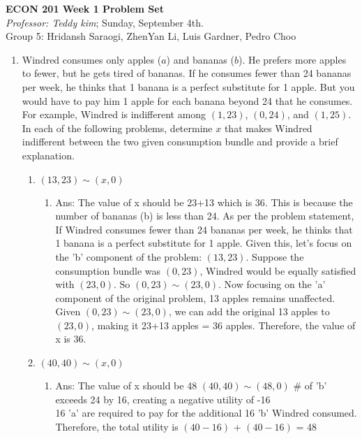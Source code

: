 \documentclass[11pt]{article}
\begin{document}
\begin{center}
\textbf{ECON 201 Week 1 Problem Set}\\
\textit {Professor: Teddy kim};  
Sunday, September 4th.
\\Group 5: Hridansh Saraogi, ZhenYan Li, Luis Gardner, Pedro Choo

\end{center}

\begin{enumerate}
\item Windred consumes only apples ($a$) and bananas ($b$). He prefers more apples to fewer, but he gets tired of bananas. If he consumes fewer than 24 bananas per week, he thinks that 1 banana is a perfect substitute for 1 apple. But you would have to pay him 1 apple for each banana beyond 24 that he consumes. For example, Windred is indifferent among $(1,23)$, $(0,24)$, and $(1,25)$. In each of the following problems, determine $x$ that makes Windred indifferent between the two given consumption bundle and provide a brief explanation.
    \begin{enumerate}
        \item $(13,23)\sim (x,0)$
        \begin{enumerate}
            \item Ans: The value of x should be 23+13 which is 36. This is because the number of bananas (b) is less than 24. As per the problem statement, If Windred consumes fewer than 24 bananas per week, he thinks that 1 banana is a perfect substitute for 1 apple. Given this, let's focus on the 'b' component of the problem: $(13,23)$. Suppose the consumption bundle was $(0,23)$, Windred would be equally satisfied with $(23,0)$. So $(0,23)\sim (23,0)$.
            Now focusing on the 'a' component of the original problem, 13 apples remains unaffected. Given $(0,23)\sim (23,0)$, we can add the original 13 apples to $(23,0)$, making it 23+13 apples = 36 apples. Therefore, the value of x is 36. 
        \end{enumerate}
        \item $(40,40)\sim (x,0)$
        \begin{enumerate}
            \item Ans: The value of x should be 48
            $(40,40)\sim (48,0)$
            # of 'b' exceeds 24 by 16, creating a negative utility of -16
            \\16 'a' are required to pay for the additional 16 'b' Windred consumed. Therefore, the total utility is $(40-16)$ + $(40-16)$ = 48

\end{enumerate}
\end{enumerate}
\end{enumerate}
\end{document}
